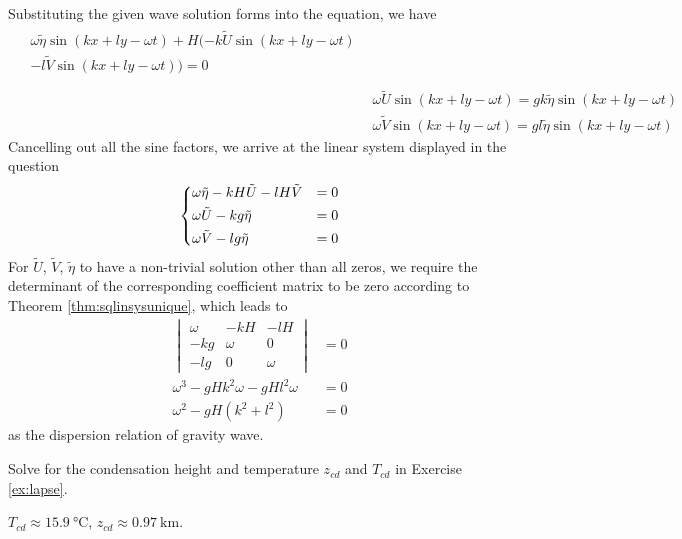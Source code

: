 \begin{Answer}
Substituting the given wave solution forms into the equation, we have
\begin{align*}
\begin{split}
&\omega\tilde{\eta}\sin(kx+ly-\omega t) + H(-k\tilde{U}\sin(kx+ly-\omega t) \\
& -l\tilde{V}\sin(kx+ly-\omega t)) = 0 \\    
\end{split} \\
& \omega\tilde{U}\sin(kx+ly-\omega t) = gk\tilde{\eta}\sin(kx+ly-\omega t) \\
& \omega\tilde{V}\sin(kx+ly-\omega t) = gl\tilde{\eta}\sin(kx+ly-\omega t)
\end{align*}
Cancelling out all the sine factors, we arrive at the linear system displayed in the question
\begin{align*}
\begin{dcases}
\omega \tilde{\eta} - kH \tilde{U} - lH \tilde{V} &= 0 \\
\omega \tilde{U} - kg \tilde{\eta} &= 0 \\
\omega \tilde{V} - lg \tilde{\eta} &= 0
\end{dcases}
\end{align*}
For $\tilde{U}$, $\tilde{V}$, $\tilde{\eta}$ to have a non-trivial solution other than all zeros, we require the determinant of the corresponding coefficient matrix to be zero according to Theorem \ref{thm:sqlinsysunique}, which leads to
\begin{align*}
\begin{vmatrix}
\omega & -kH & -lH \\
-kg & \omega & 0 \\
-lg & 0 & \omega
\end{vmatrix} &= 0 \\
\omega^3 - gHk^2\omega - gHl^2\omega &= 0 \\
\omega^2 - gH(k^2 + l^2) &= 0 
\end{align*}
as the dispersion relation of gravity wave.
\end{Answer}

\begin{Exercise}
Solve for the condensation height and temperature $z_{cd}$ and $T_{cd}$ in Exercise \ref{ex:lapse}.
\end{Exercise}
\begin{Answer}
$T_{cd} \approx \SI{15.9}{\celsius}$, $z_{cd} \approx \SI{0.97}{\km}$.
\end{Answer}

